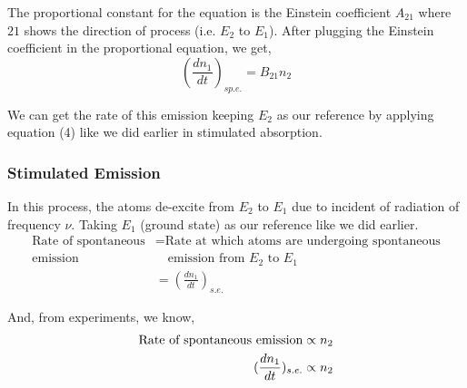 \documentclass[12pt]{article}
\begin{document}
The proportional constant for the equation is the Einstein coefficient $A_{21}$ where $21$ shows the direction of process (i.e. $E_{2}$ to $E_{1}$). After plugging the Einstein coefficient in the proportional equation, we get,
\begin{equation}
    (\frac{dn_{1}}{dt})_{sp.e.} = B_{21}n_{2}
\end{equation}

We can get the rate of this emission keeping $E_{2}$ as our reference by applying equation (4) like we did earlier in stimulated absorption.

\subsubsection{Stimulated Emission}

In this process, the atoms de-excite from $E_{2}$ to $E_{1}$ due to incident of radiation of frequency $\nu$. Taking $E_{1}$ (ground state) as our reference like we did earlier.
\begin{align*}
    \text{Rate of spontaneous} & = \text{Rate at which atoms are undergoing spontaneous} \\
    \text{emission} & \quad \text{emission from } E_{2} \text{ to } E_{1} \\ 
    & = (\frac{dn_{1}}{dt})_{s.e.}
\end{align*}

And, from experiments, we know, 
\begin{align*}
    \textnormal{Rate of spontaneous emission} \propto n_{2} \\ 
    (\frac{dn_{1}}{dt})_{s.e.} \propto n_{2}
\end{align*}
\end{document}
